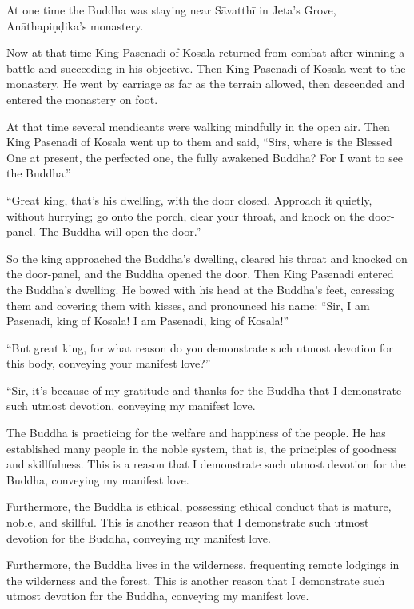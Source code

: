 \documentclass[12pt,openany]{book}%
\begin{document}
At one time the Buddha was staying near \textsanskrit{Sāvatthī} in Jeta’s Grove, \textsanskrit{Anāthapiṇḍika}’s monastery. 

Now at that time King Pasenadi of Kosala returned from combat after winning a battle and succeeding in his objective. Then King Pasenadi of Kosala went to the monastery. He went by carriage as far as the terrain allowed, then descended and entered the monastery on foot. 

At that time several mendicants were walking mindfully in the open air. Then King Pasenadi of Kosala went up to them and said, “Sirs, where is the Blessed One at present, the perfected one, the fully awakened Buddha? For I want to see the Buddha.” 

“Great king, that’s his dwelling, with the door closed. Approach it quietly, without hurrying; go onto the porch, clear your throat, and knock on the door-panel. The Buddha will open the door.” 

So the king approached the Buddha’s dwelling, cleared his throat and knocked on the door-panel, and the Buddha opened the door. Then King Pasenadi entered the Buddha’s dwelling. He bowed with his head at the Buddha’s feet, caressing them and covering them with kisses, and pronounced his name: “Sir, I am Pasenadi, king of Kosala! I am Pasenadi, king of Kosala!” 

“But great king, for what reason do you demonstrate such utmost devotion for this body, conveying your manifest love?” 

“Sir, it’s because of my gratitude and thanks for the Buddha that I demonstrate such utmost devotion, conveying my manifest love. 

The Buddha is practicing for the welfare and happiness of the people. He has established many people in the noble system, that is, the principles of goodness and skillfulness. This is a reason that I demonstrate such utmost devotion for the Buddha, conveying my manifest love. 

Furthermore, the Buddha is ethical, possessing ethical conduct that is mature, noble, and skillful. This is another reason that I demonstrate such utmost devotion for the Buddha, conveying my manifest love. 

Furthermore, the Buddha lives in the wilderness, frequenting remote lodgings in the wilderness and the forest. This is another reason that I demonstrate such utmost devotion for the Buddha, conveying my manifest love. 
\end{document}
